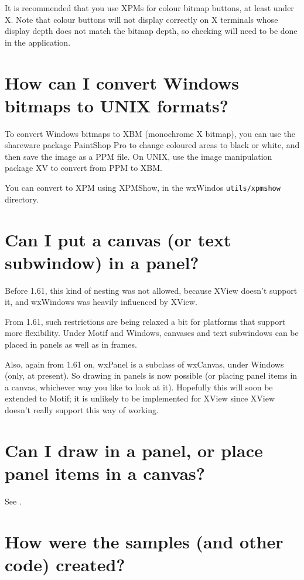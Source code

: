 It is recommended that you use XPMs for colour bitmap buttons,
at least under X. Note that colour buttons will not display correctly
on X terminals whose display depth does not match the bitmap depth,
so checking will need to be done in the application.

\section{How can I convert Windows bitmaps to UNIX formats?}

To convert Windows bitmaps to XBM (monochrome X bitmap), you can use the
shareware package PaintShop Pro to change coloured areas to black or
white, and then save the image as a PPM file.  On UNIX, use the image
manipulation package XV to convert from PPM to XBM. 

You can convert to XPM using XPMShow, in the wxWindos {\tt utils/xpmshow} directory.

\section{Can I put a canvas (or text subwindow) in a panel?}\label{nesting}

Before 1.61, this kind of nesting was not allowed, because XView
doesn't support it, and wxWindows was heavily influenced by XView.

From 1.61, such restrictions are being relaxed a bit for platforms
that support more flexibility. Under Motif and Windows, canvases and
text subwindows can be placed in panels as well as in frames.

Also, again from 1.61 on, wxPanel is a subclass of wxCanvas, under Windows
(only, at present). So drawing in panels is now possible (or placing panel items in
a canvas, whichever way you like to look at it). Hopefully this will soon be
extended to Motif; it is unlikely to be implemented for XView since
XView doesn't really support this way of working.

\section{Can I draw in a panel, or place panel items in a canvas?}

See .

\section{How were the samples (and other code) created?}

